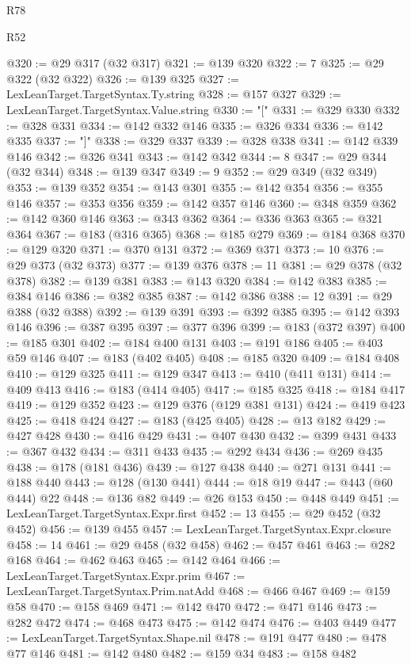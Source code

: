 \begin{lexlean}{R78}
\begin{lexlean}{R52}
\begin{coremodule}
{{{{{{{{{{{{{{{{{{{{{{{{{{{{{{{{{{{{{{{{{{{{{{{{{{{{{{{{{{{{{{{{{{{{{{{{{{{{{{{{{{{{{{{{{{{{{{{{{{{{{{{{{{{{{{{{{{{{{{{{{{{{{{{{{{{{{{{{{{{{{{{{{{{{{{{{{{{{{{{{{{{{{{{{{{{{{{{{{{{{{{{{{{{{{{{{{{{{{{@320 := @29 @317 (@32 @317)
@321 := @139 @320
@322 := 7
@325 := @29 @322 (@32 @322)
@326 := @139 @325
@327 := LexLeanTarget.TargetSyntax.Ty.string
@328 := @157 @327
@329 := LexLeanTarget.TargetSyntax.Value.string
@330 := "["
@331 := @329 @330
@332 := @328 @331
@334 := @142 @332 @146
@335 := @326 @334
@336 := @142 @335
@337 := "]"
@338 := @329 @337
@339 := @328 @338
@341 := @142 @339 @146
@342 := @326 @341
@343 := @142 @342
@344 := 8
@347 := @29 @344 (@32 @344)
@348 := @139 @347
@349 := 9
@352 := @29 @349 (@32 @349)
@353 := @139 @352
@354 := @143 @301
@355 := @142 @354
@356 := @355 @146
@357 := @353 @356
@359 := @142 @357 @146
@360 := @348 @359
@362 := @142 @360 @146
@363 := @343 @362
@364 := @336 @363
@365 := @321 @364
@367 := @183 (@316 @365)
@368 := @185 @279
@369 := @184 @368
@370 := @129 @320
@371 := @370 @131
@372 := @369 @371
@373 := 10
@376 := @29 @373 (@32 @373)
@377 := @139 @376
@378 := 11
@381 := @29 @378 (@32 @378)
@382 := @139 @381
@383 := @143 @320
@384 := @142 @383
@385 := @384 @146
@386 := @382 @385
@387 := @142 @386
@388 := 12
@391 := @29 @388 (@32 @388)
@392 := @139 @391
@393 := @392 @385
@395 := @142 @393 @146
@396 := @387 @395
@397 := @377 @396
@399 := @183 (@372 @397)
@400 := @185 @301
@402 := @184 @400 @131
@403 := @191 @186
@405 := @403 @59 @146
@407 := @183 (@402 @405)
@408 := @185 @320
@409 := @184 @408
@410 := @129 @325
@411 := @129 @347
@413 := @410 (@411 @131)
@414 := @409 @413
@416 := @183 (@414 @405)
@417 := @185 @325
@418 := @184 @417
@419 := @129 @352
@423 := @129 @376 (@129 @381 @131)
@424 := @419 @423
@425 := @418 @424
@427 := @183 (@425 @405)
@428 := @13 @182
@429 := @427 @428
@430 := @416 @429
@431 := @407 @430
@432 := @399 @431
@433 := @367 @432
@434 := @311 @433
@435 := @292 @434
@436 := @269 @435
@438 := @178 (@181 @436)
@439 := @127 @438
@440 := @271 @131
@441 := @188 @440
@443 := @128 (@130 @441)
@444 := @18 @19
@447 := @443 (@60 @444) @22
@448 := @136 @82
@449 := @26 @153
@450 := @448 @449
@451 := LexLeanTarget.TargetSyntax.Expr.first
@452 := 13
@455 := @29 @452 (@32 @452)
@456 := @139 @455
@457 := LexLeanTarget.TargetSyntax.Expr.closure
@458 := 14
@461 := @29 @458 (@32 @458)
@462 := @457 @461
@463 := @282 @168
@464 := @462 @463
@465 := @142 @464
@466 := LexLeanTarget.TargetSyntax.Expr.prim
@467 := LexLeanTarget.TargetSyntax.Prim.natAdd
@468 := @466 @467
@469 := @159 @58
@470 := @158 @469
@471 := @142 @470
@472 := @471 @146
@473 := @282 @472
@474 := @468 @473
@475 := @142 @474
@476 := @403 @449
@477 := LexLeanTarget.TargetSyntax.Shape.nil
@478 := @191 @477
@480 := @478 @77 @146
@481 := @142 @480
@482 := @159 @34
@483 := @158 @482
}}}}}}}}}}}}}}}}}}}}}}}}}}}}}}}}}}}}}}}}}}}}}}}}}}}}}}}}}}}}}}}}}}}}}}}}}}}}}}}}}}}}}}}}}}}}}}}}}}}}}}}}}}}}}}}}}}}}}}}}}}}}}}}}}}}}}}}}}}}}}}}}}}}}}}}}}}}}}}}}}}}}}}}}}}}}}}}}}}}}}}}}}}}}}}}}}}}}}}
\end{coremodule}
\end{lexlean}
\end{lexlean}
